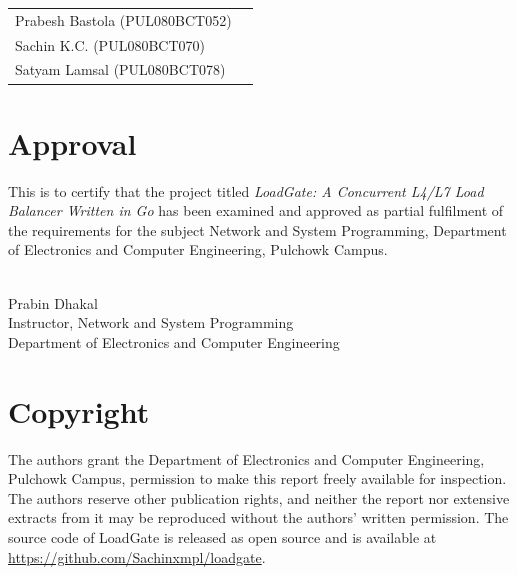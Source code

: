 \documentclass[11pt,a4paper]{report}
\begin{document}
\vspace{1.5cm}
\noindent
\begin{tabular}{ll}
Prabesh Bastola (PUL080BCT052) & \hspace{3cm}\dotfill\\[0.8cm]
Sachin K.C. (PUL080BCT070)     & \hspace{3cm}\dotfill\\[0.8cm]
Satyam Lamsal (PUL080BCT078)   & \hspace{3cm}\dotfill\\
\end{tabular}

\chapter*{Approval}
This is to certify that the project titled \emph{LoadGate: A Concurrent L4/L7 Load
Balancer Written in Go} has been examined and approved as partial fulfilment of the
requirements for the subject Network and System Programming, Department of Electronics and
Computer Engineering, Pulchowk Campus.

\vspace{2.5cm}
\noindent
\makebox[7cm]{\dotfill}\\
Prabin Dhakal\\
Instructor, Network and System Programming\\
Department of Electronics and Computer Engineering

\chapter*{Copyright}
The authors grant the Department of Electronics and Computer Engineering, Pulchowk Campus,
permission to make this report freely available for inspection. The authors reserve other
publication rights, and neither the report nor extensive extracts from it may be reproduced
without the authors' written permission. The source code of LoadGate is released as open
source and is available at \url{https://github.com/Sachinxmpl/loadgate}.

\end{document}
